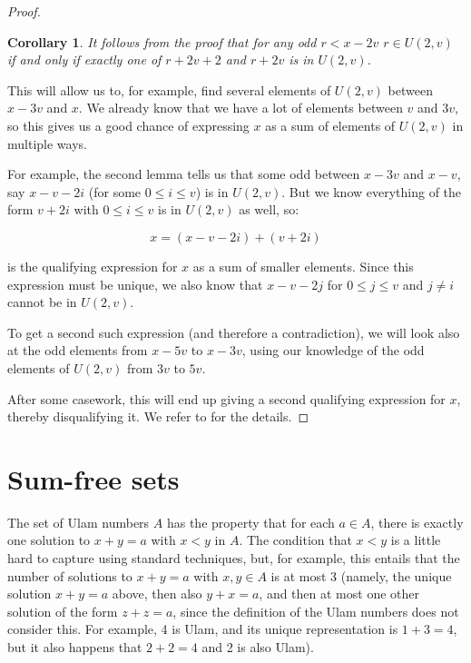 \documentclass{report}
\newtheorem{corollary}{Corollary}[theorem]
\theoremstyle{remark}
\numberwithin{equation}{section}
\begin{document}
\begin{proof}
  \begin{corollary}
    It follows from the proof that for any odd $r < x-2v$
    $r \in U(2,v)$ if and only if exactly one of $r+2v+2$ and $r+2v$
    is in $U(2,v)$.
  \end{corollary}

  This will allow us to, for example, find several elements of
  $U(2,v)$ between $x-3v$ and $x$.  We already know that we have a lot
  of elements between $v$ and $3v$, so this gives us a good chance of
  expressing $x$ as a sum of elements of $U(2,v)$ in multiple ways.  

  For example, the second lemma tells us that some odd between $x-3v$
  and $x-v$, say $x-v-2i$ (for some $0 \leq i \leq v$) is in
  $U(2,v)$.  But we know everything of the form $v+2i$ with $0 \leq i
  \leq v$ is in $U(2,v)$ as well, so: 

  \[x = (x-v-2i)+(v+2i)\]

  is the qualifying expression for $x$ as a sum of smaller elements.
  Since this expression must be unique, we also know that $x-v-2j$ for
  $0 \leq j \leq v$ and $j \neq i$ cannot be in $U(2,v)$.  

  To get a second such expression (and therefore a contradiction), we
  will look also at the odd elements from $x-5v$ to $x-3v$, using our
  knowledge of the odd elements of $U(2,v)$ from $3v$ to $5v$.  

  After some casework, this will end up giving a second qualifying
  expression for $x$, thereby disqualifying it.  We refer to
  \cite{schmerl:jct1994} for the details.
  

  \end{proof}

\section{Sum-free sets}

The set of Ulam numbers $A$ has the property that for each $a \in A$,
there is exactly one solution to $x+y=a$ with $x < y$ in $A$.  The
condition that $x < y$ is a little hard to capture using standard
techniques, but, for example, this entails that the number of
solutions to $x + y = a$ with $x, y \in A$ is at most 3 (namely, the
unique solution $x+y = a$ above, then also $y+x = a$, and then at most
one other solution of the form $z+z = a$, since the definition of the
Ulam numbers does not consider this.  For example, 4 is Ulam, and its
unique representation is $1+3=4$, but it also happens that $2+2=4$ and
2 is also Ulam).
\end{document}
